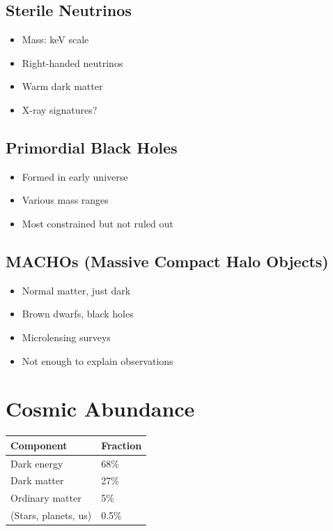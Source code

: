 \documentclass[
  11pt,
  letterpaper,
  twoside,
  openright]{book}
\providecommand{\tightlist}{%
  \setlength{\itemsep}{0pt}\setlength{\parskip}{0pt}}
\begin{document}
\subsection{Sterile Neutrinos}\label{sterile-neutrinos}

\begin{itemize}
\tightlist
\item
  Mass: keV scale
\item
  Right-handed neutrinos
\item
  Warm dark matter
\item
  X-ray signatures?
\end{itemize}

\subsection{Primordial Black Holes}\label{primordial-black-holes}

\begin{itemize}
\tightlist
\item
  Formed in early universe
\item
  Various mass ranges
\item
  Most constrained but not ruled out
\end{itemize}

\subsection{MACHOs (Massive Compact Halo
Objects)}\label{machos-massive-compact-halo-objects}

\begin{itemize}
\tightlist
\item
  Normal matter, just dark
\item
  Brown dwarfs, black holes
\item
  Microlensing surveys
\item
  Not enough to explain observations
\end{itemize}

\section{Cosmic Abundance}\label{cosmic-abundance}

\begin{longtable}[]{@{}ll@{}}
\toprule\noalign{}
Component & Fraction \\
\midrule\noalign{}
\endhead
\bottomrule\noalign{}
\endlastfoot
Dark energy & 68\% \\
Dark matter & 27\% \\
Ordinary matter & 5\% \\
(Stars, planets, us) & 0.5\% \\
\end{longtable}
\end{document}
